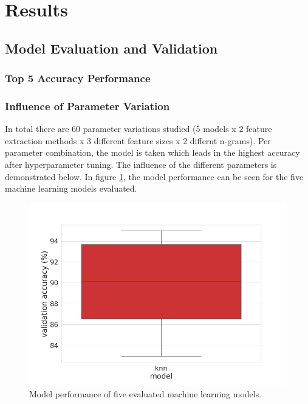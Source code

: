 \documentclass[a4paper,12pt,nottoc]{article}
\begin{document}
\section{Results}

\subsection{Model Evaluation and Validation}

\subsubsection{Top 5 Accuracy Performance}

\subsubsection{Influence of Parameter Variation}

In total there are 60 parameter variations studied (5 models x 2 feature extraction methods x 3 different feature sizes x 2 differnt n-grams). Per parameter combination, the model is taken which leads in the highest accuracy after hyperparameter tuning. The influence of the different parameters is demonstrated below. In figure \ref{fig:modelperf}, the model performance can be seen for the five machine learning models evaluated. 

\begin{figure}[h]
\includegraphics[width=14cm]{output/model_performance.png}
\centering
\caption{Model performance of five evaluated machine learning models.}\label{fig:modelperf}
\end{figure}
\end{document}
